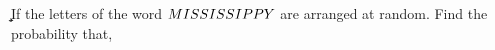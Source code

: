 {{{      \renewcommand{\vbfftn}{4!2!}
      \renewcommand{\vbsxtn}{\dfrac{1}{26}}
      \renewcommand{\vbsvntn}{\dfrac{25}{26}}
      \renewcommand{\vbeghtn}{\dfrac{5}{13}}
      \renewcommand{\vbnntn}{\dfrac{15}{26}}
      \renewcommand{\vbtwnty}{\dfrac{4!}{2!}}
      \renewcommand{\vbtone}{4!3!}
      \renewcommand{\vbttwo}{10}
    }{
      \renewcommand{\vbone}{MISSISSIPPY}
      \renewcommand{\vbtwo}{S}
      \renewcommand{\vbthree}{SSSS}
      \renewcommand{\vbfour}{III}
      \renewcommand{\vbfive}{II}
      \renewcommand{\vbsix}{I}
      \renewcommand{\vbseven}{M,P,Y}
      \renewcommand{\vbeight}{ISSI\textbf{MPPY}ISS}
      \renewcommand{\vbnine}{11}
      \renewcommand{\vbten}{4!3!2!}
      \renewcommand{\vblven}{3!2!}
      \renewcommand{\vbtwlv}{\dfrac{4}{165}}
      \renewcommand{\vbthrtn}{\dfrac{4}{165}}
      \renewcommand{\vbfrtn}{M\textbf{II}SSISIPPY}
      \renewcommand{\vbfftn}{4!2!}
      \renewcommand{\vbsxtn}{\dfrac{3}{55}}
      \renewcommand{\vbsvntn}{\dfrac{52}{55}}
      \renewcommand{\vbeghtn}{\dfrac{12}{55}}
      \renewcommand{\vbnntn}{\dfrac{40}{55}}
      \renewcommand{\vbtwnty}{\dfrac{4!}{2!}}
      \renewcommand{\vbtone}{4!3!}
      \renewcommand{\vbttwo}{8}
    }
  }
}
\SUBTRACT{}\a
\SUBTRACT{}\b
\SUBTRACT{}\c

\question If the letters of the word $\vbone$ are arranged at 
random. Find the probability that,


